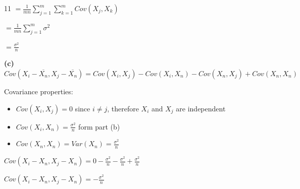 \documentclass[12 pt]{article}
\begin{document}
\begin{exercise}{11}
    $= \frac{1}{mn} \sum_{j=1}^{m} \sum_{k=1}^{m} Cov(X_j, X_k)$

    $= \frac{1}{mn} \sum_{j=1}^{m} \sigma^2$

    $= \frac{\sigma^2}{n}$

    \hfill

    \textbf{(c)} 
    $Cov(X_i - \overline{X_n}, X_j - \overline{X_n}) = Cov(X_i, X_j) - Cov(X_i, X_n) - Cov(X_n, X_j) + Cov(X_n, X_n)$

    \hfill

    Covariance properties:
    \begin{itemize}
        \item $Cov(X_i, X_j) = 0$ since $i \neq j$, therefore $X_i$ and $X_j$ are independent
        \item $Cov(X_i, X_n) = \frac{\sigma^2}{n}$ form part (b)
        \item $Cov(X_n, X_n) = Var(X_n) = \frac{\sigma^2}{n}$
    \end{itemize}

    \hfill

    $Cov(X_i - X_n, X_j - X_n) = 0 - \frac{\sigma^2}{n} - \frac{\sigma^2}{n} + \frac{\sigma^2}{n}$

    $Cov(X_i - X_n, X_j - X_n) = -\frac{\sigma^2}{n}$

    \hfill
    \end{exercise}
\end{document}

